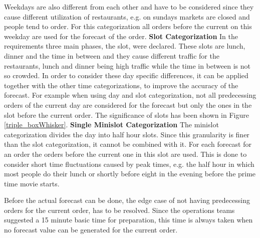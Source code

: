 Weekdays are also different from each other and have to be considered since they cause different utilization of restaurants, e.g. on sundays markets are closed and people tend to order. For this categorization all orders before the current on this weekday are used for the forecast of the order.
\newline\newline\textbf{Slot Categorization}\newline
In the requirements three main phases, the slot, were declared. These slots are lunch, dinner and the time in between and they cause different traffic for the restaurants, lunch and dinner being high traffic while the time in between is not so crowded. In order to consider these day specific differences, it can be applied together with the other time categorizations, to improve the accuracy of the forecast. For example when using day and slot categorization, not all predecessing orders of the current day are considered for the forecast but only the ones in the slot before the current order. The significance of slots has been shown in Figure \ref{triple_boxWhisker}.
\newline\newline\textbf{Single Minislot Categorization}\newline
The minislot categorization divides the day into half hour slots. Since this granularity is finer than the slot categorization, it cannot be combined with it. For each forecast for an order the orders before the current one in this slot are used. This is done to consider short time fluctuations caused by peak times, e.g. the half hour in which most people do their lunch or shortly before eight in the evening before the prime time movie starts.


\newline
Before the actual forecast can be done, the edge case of not having predecessing orders for the current order, has to be resolved. Since the operations teams suggested a 15 minute basic time for preparation, this time is always taken when no forecast value can be generated for the current order.
